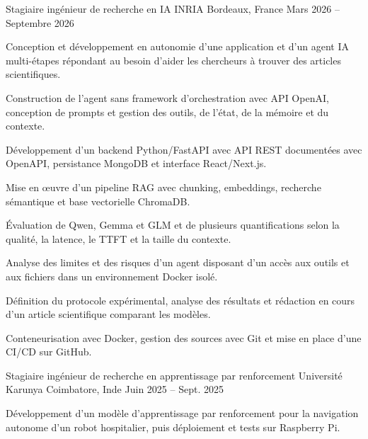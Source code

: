 
\begin{cventries}
  \cventry
    {Stagiaire ingénieur de recherche en IA}
    {INRIA}
    {Bordeaux, France}
    {Mars 2026 -- Septembre 2026}
    {
      \begin{cvitems}
        \item {Conception et développement en autonomie d’une application et d’un agent IA multi-étapes répondant au besoin d’aider les chercheurs à trouver des articles scientifiques.}
        \item {Construction de l’agent sans framework d’orchestration avec API OpenAI, conception de prompts et gestion des outils, de l’état, de la mémoire et du contexte.}
        \item {Développement d’un backend Python/FastAPI avec API REST documentées avec OpenAPI, persistance MongoDB et interface React/Next.js.}
        \item {Mise en œuvre d’un pipeline RAG avec chunking, embeddings, recherche sémantique et base vectorielle ChromaDB.}
        \item {Évaluation de Qwen, Gemma et GLM et de plusieurs quantifications selon la qualité, la latence, le TTFT et la taille du contexte.}
        \item {Analyse des limites et des risques d’un agent disposant d’un accès aux outils et aux fichiers dans un environnement Docker isolé.}
        \item {Définition du protocole expérimental, analyse des résultats et rédaction en cours d’un article scientifique comparant les modèles.}
        \item {Conteneurisation avec Docker, gestion des sources avec Git et mise en place d’une CI/CD sur GitHub.}
      \end{cvitems}
    }

  \cventry
    {Stagiaire ingénieur de recherche en apprentissage par renforcement}
    {Université Karunya}
    {Coimbatore, Inde}
    {Juin 2025 -- Sept. 2025}
    {
      \begin{cvitems}
        \item {Développement d’un modèle d’apprentissage par renforcement pour la navigation autonome d’un robot hospitalier, puis déploiement et tests sur Raspberry Pi.}
      \end{cvitems}
    }
\end{cventries}
